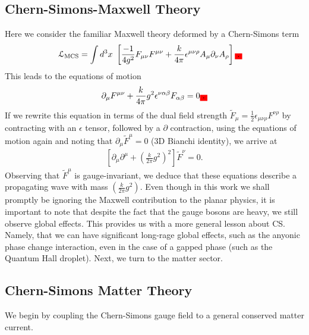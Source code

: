     \subsection{Chern-Simons-Maxwell Theory}
    Here we consider the familiar Maxwell theory deformed by a Chern-Simons term\colorbox{red}{ }
    \begin{align}
        \mathcal{L}_{\text{MCS}} &= \int d^3x \ \left[ \frac{-1}{4 g^2} F_{\mu \nu} F^{\mu \nu} + \frac{k}{4 \pi} \epsilon^{\mu \nu \rho} A_{\mu} \partial_{\nu} A_{\rho} \right]\colorbox{red}{.}
    \end{align}
    This leads to the equations of motion
    \begin{align}
        \partial_{\mu} F^{\mu \nu} + \frac{k}{4\pi} g^2 \epsilon^{\nu \alpha \beta}F_{\alpha \beta} =0\colorbox{red}{.}
    \end{align}
    If we rewrite this equation in terms of the dual field strength $\tilde{F}_{\mu} = \frac{1}{2} \epsilon_{\mu\nu\rho} F^{\nu\rho}$ by contracting with an $\epsilon$ tensor, followed by a $\partial$ contraction, using the equations of motion again and noting that $\partial_{\mu} \tilde{F}^{\mu} =0$ (3D Bianchi identity), we arrive at 
    \begin{align}
        \left[\partial_{\mu} \partial^{\mu} + \left(\frac{k}{2 \pi} g^2 \right)^2 \right] \tilde{F}^{\nu}=0.
    \end{align}
    Observing that $\tilde{F}^{\mu}$ is gauge-invariant, we deduce that these equations describe a propagating wave with mass $\left(\frac{k}{2 \pi} g^2 \right)$.
    Even though in this work we shall promptly be ignoring the Maxwell contribution to the planar physics, it is important to note that despite the fact that the gauge bosons are heavy, we still observe global effects. This provides us with a more general lesson about CS. Namely, that we can have significant long-rage global effects, such as the anyonic phase change interaction, even in the case of a gapped phase (such as the Quantum Hall droplet).
    Next, we turn to the matter sector.
    \subsection{Chern-Simons Matter Theory}
    
    We begin by coupling the Chern-Simons gauge field to a general conserved matter current.


